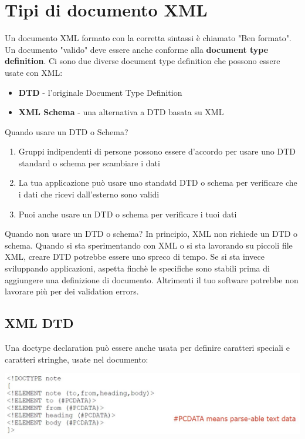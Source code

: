 \section{Tipi di documento XML}
Un documento XML formato con la corretta sintassi è chiamato "Ben formato". Un documento "valido" deve essere anche conforme alla \textbf{document type definition}. Ci sono due diverse document type definition che possono essere usate con XML:
\begin{itemize}
    \item \textbf{DTD} - l'originale Document Type Definition
    \item \textbf{XML Schema} - una alternativa a DTD basata su XML
\end{itemize}
Quando usare un DTD o Schema?
\begin{enumerate}
    \item Gruppi indipendenti di persone possono essere d'accordo per usare uno DTD standard o schema per scambiare i dati
    \item La tua applicazione può usare uno standatd DTD o schema per verificare che i dati che ricevi dall'esterno sono validi
    \item Puoi anche usare un DTD o schema per verificare i tuoi dati
\end{enumerate}

Quando non usare un DTD o schema?
In principio, XML non richiede un DTD o schema. Quando si sta sperimentando con XML o si sta lavorando su piccoli file XML, creare DTD potrebbe essere uno spreco di tempo. Se si sta invece sviluppando applicazioni, aspetta finchè le specifiche sono stabili prima di aggiungere una definizione di documento. Altrimenti il tuo software potrebbe non lavorare più per dei validation errors. 

\subsection{XML DTD}
Una doctype declaration può essere anche usata per definire caratteri speciali e caratteri stringhe, usate nel documento:
\begin{center}
    \includegraphics[scale=0.4]{Images/TecnologieWeb/5/DTD.jpg}
\end{center}

